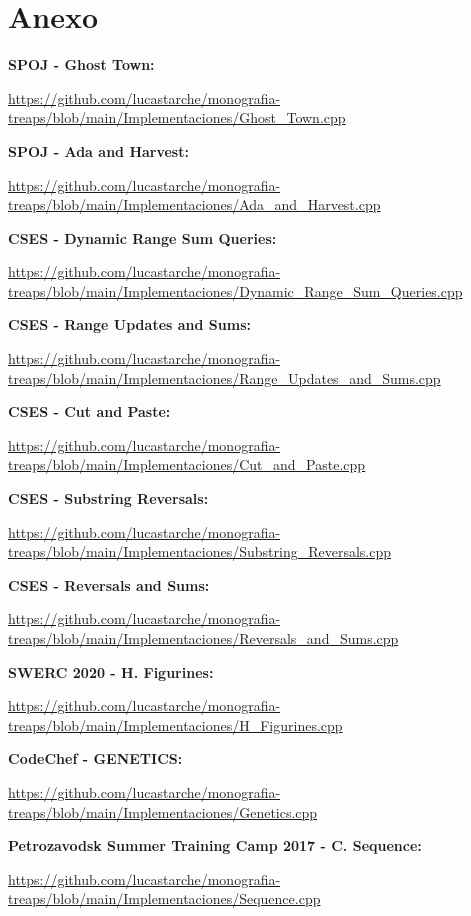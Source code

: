 \section{Anexo}

\textbf{SPOJ - Ghost Town:}

\url{https://github.com/lucastarche/monografia-treaps/blob/main/Implementaciones/Ghost_Town.cpp}

\textbf{SPOJ - Ada and Harvest:} 

\url{https://github.com/lucastarche/monografia-treaps/blob/main/Implementaciones/Ada_and_Harvest.cpp}

\textbf{CSES - Dynamic Range Sum Queries:} 

\url{https://github.com/lucastarche/monografia-treaps/blob/main/Implementaciones/Dynamic_Range_Sum_Queries.cpp}

\textbf{CSES - Range Updates and Sums:} 

\url{https://github.com/lucastarche/monografia-treaps/blob/main/Implementaciones/Range_Updates_and_Sums.cpp}

\textbf{CSES - Cut and Paste:} 

\url{https://github.com/lucastarche/monografia-treaps/blob/main/Implementaciones/Cut_and_Paste.cpp}

\textbf{CSES - Substring Reversals:} 

\url{https://github.com/lucastarche/monografia-treaps/blob/main/Implementaciones/Substring_Reversals.cpp}

\textbf{CSES - Reversals and Sums:} 

\url{https://github.com/lucastarche/monografia-treaps/blob/main/Implementaciones/Reversals_and_Sums.cpp}

\textbf{SWERC 2020 - H. Figurines:} 

\url{https://github.com/lucastarche/monografia-treaps/blob/main/Implementaciones/H_Figurines.cpp}

\textbf{CodeChef - GENETICS:} 

\url{https://github.com/lucastarche/monografia-treaps/blob/main/Implementaciones/Genetics.cpp}

\textbf{Petrozavodsk Summer Training Camp 2017 - C. Sequence:}

\url{https://github.com/lucastarche/monografia-treaps/blob/main/Implementaciones/Sequence.cpp}